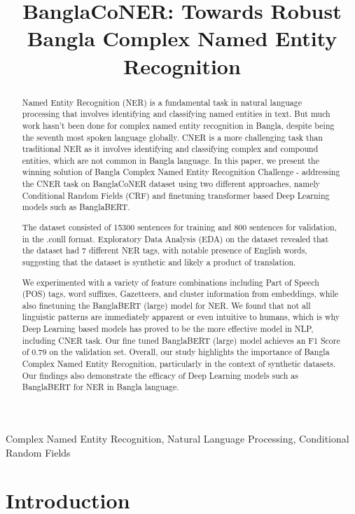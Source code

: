 \documentclass{article}
\title{BanglaCoNER: Towards Robust Bangla Complex Named Entity Recognition}
\begin{document}
\maketitle
\begin{abstract}
Named Entity Recognition (NER) is a fundamental task in natural language processing that involves identifying and classifying named entities in text. But much work hasn’t been done for complex named entity recognition in Bangla, despite being the seventh most spoken language globally. CNER is a more challenging task than traditional NER as it involves identifying and classifying complex and compound entities, which are not common in Bangla language. In this paper, we present the winning solution of Bangla Complex Named Entity Recognition Challenge - addressing the CNER task on BanglaCoNER dataset using two different approaches, namely Conditional Random Fields (CRF) and finetuning transformer based Deep Learning models such as BanglaBERT.

The dataset consisted of 15300 sentences for training and 800 sentences for validation, in the .conll format. Exploratory Data Analysis (EDA) on the dataset revealed that the dataset had 7 different NER tags, with notable presence of English words, suggesting that the dataset is synthetic and likely a product of translation.

We experimented with a variety of feature combinations including Part of Speech (POS) tags, word suffixes, Gazetteers, and cluster information from embeddings, while also finetuning the BanglaBERT (large) model for NER. We found that not all linguistic patterns are immediately apparent or even intuitive to humans, which is why Deep Learning based models has proved to be the more effective model in NLP, including CNER task. Our fine tuned BanglaBERT (large) model achieves an F1 Score of 0.79 on the validation set. Overall, our study highlights the importance of Bangla Complex Named Entity Recognition, particularly in the context of synthetic datasets. Our findings also demonstrate the efficacy of Deep Learning models such as BanglaBERT for NER in Bangla language.
\end{abstract}
\begin{keywords}
Complex Named Entity Recognition, Natural Language Processing, Conditional Random Fields
\end{keywords}
\section{Introduction}
\label{sec:intro}
\end{document}
